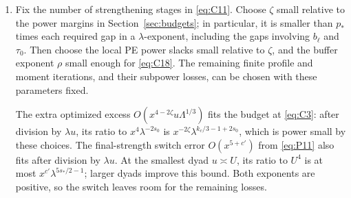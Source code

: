 \begin{enumerate}
Now choose \(a_0\) small relative to \(c,\delta_*\), take \(b_H\)
to be a sufficiently small fixed fraction of \(a_0\), then choose
\(a_1\) small relative to \(a_0,b_H\), and \(a_2\) small relative
to \(a_1\).  Finally choose \(p_*\) small relative to these gaps and
to \(h_e\), including the restriction needed for the cap on \(Y\)
after \eqref{eq:D11}.  With \(V_i=x^{a_i}\), the high-mass terms
of \eqref{eq:E3} then have the following positive margins over
\(x^5\):
\[
\begin{gathered}
 1-2C_Ha_1>0,\qquad b_H-C_Ha_1>0,\qquad b_H-Cp_*>0,\\
 a_1-C_Ha_2-p_*s_*>0,\qquad
 \delta_*/2-C_Ha_2-p_*s_*>0.
\end{gathered}
\]
The first two margins cover two high stochastic factors and a high
stochastic factor paired with a high deterministic factor.  The third
covers a high deterministic factor times the low-source estimate
\eqref{eq:D16}.  The last two cover a sole high stochastic factor,
using respectively the parity-weighted integral \(V_1Y^2\) or a
further factor \(x^{\delta_*/2}Y^2\).  In both cases
\(Y^2=x^2\lambda^{-s_*}Z^2\).  The size projection errors
\(x^6\lambda^{-C}=x^{6-Cp_*}\) also have the positive margin
\(1-Cp_*\).  No subsequent step decreases \(p_*\).

\item Fix the number of strengthening stages in \eqref{eq:C11}.
Choose \(\zeta\) small relative to the power margins in
Section~\ref{sec:budgets}; in particular, it is smaller than \(p_*\)
times each required gap in a \(\lambda\)-exponent, including the gaps
involving \(b_\ell\) and \(\tau_0\).  Then choose the local PE
power slacks small relative to \(\zeta\), and the buffer exponent
\(\rho\) small enough for \eqref{eq:C18}.  The remaining finite
profile and moment iterations, and their subpower losses, can be
chosen with these parameters fixed.

The extra optimized excess
\(O(x^{4-2\zeta}u\Lambda^{1/3})\) fits the budget at
\eqref{eq:C3}: after division by \(\lambda u\), its ratio to
\(x^4\lambda^{-2s_0}\) is
\(x^{-2\zeta}\lambda^{k_c/3-1+2s_0}\), which is power small by
these choices.  The final-strength switch error
\(O(x^{5+c'})\) from \eqref{eq:P11} also fits after division by
\(\lambda u\).  At the smallest dyad \(u\asymp U\), its ratio
to \(U^4\) is at most
\(x^{c'}\lambda^{5s_*/2-1}\); larger dyads improve this bound.
Both exponents are positive, so the switch leaves room for the
remaining losses.


\end{enumerate}
